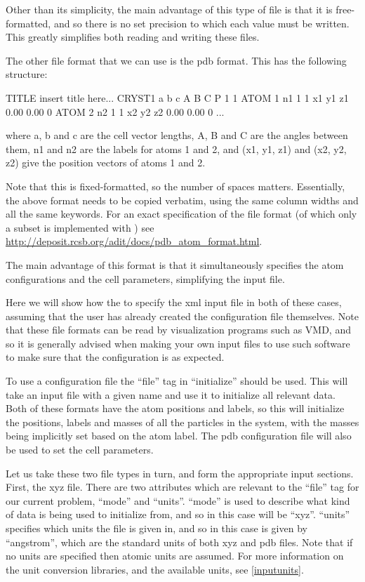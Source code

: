 \documentclass[11pt,english,fleqn]{report}
\newenvironment{code}{%
\footnotesize 
\verbatim
}{
\endverbatim
\normalsize
}
\begin{document}
Other than its simplicity, the main advantage of this type of file
is that it is free-formatted, and so there is no set precision
to which each value must be written. This greatly simplifies
both reading and writing these files.

The other file format that we can use is the pdb format. This
has the following structure:

\begin{code}
TITLE insert title here...
CRYST1        a        b        c      A      B      C P 1           1
ATOM      1   n1   1     1          x1      y1      z1  0.00  0.00             0
ATOM      2   n2   1     1          x2      y2      z2  0.00  0.00             0
...
\end{code}
where a, b and c are the cell vector lengths, A, B and C are the angles between
them, n1 and n2 are the labels for atoms 1 and 2, and (x1, y1, z1)
and (x2, y2, z2) give the position vectors of atoms 1 and 2. 

Note that this is
fixed-formatted, so the number of spaces matters. Essentially, the
above format needs to be copied verbatim, using the same column
widths and all the same keywords. For an exact specification
of the file format (of which only a subset is implemented 
with \ipi) see
\url{http://deposit.rcsb.org/adit/docs/pdb_atom_format.html}.

The main advantage of this format is that it simultaneously specifies
the atom configurations and the cell parameters, simplifying
the input file.

Here we will show how the to specify the xml input file
in both of these cases, assuming that the user has already
created the configuration file themselves.
Note that these file formats can be read by
visualization programs such as VMD, and so it is generally advised 
when making your own input files to
use such software to make sure that the configuration is as expected.

To use a configuration file the {}``file'' tag in {}``initialize'' should be used.
This will take an input file with a given name and use it to initialize
all relevant data. Both of these formats have the atom
positions and labels, so this will initialize the positions, labels
and masses of all the particles in the system, with the masses being
implicitly set based on the atom label. The pdb configuration file
will also be used to set the cell parameters.

Let us take these two file types in turn, and form the appropriate
input sections. First, the xyz file. 
There are two attributes which are relevant to the {}``file'' tag
for our current problem, {}``mode'' and {}``units''.
{}``mode'' is used to describe what kind of data is being used to
initialize from, and so in this case will be {}``xyz''.
{}``units'' specifies which units the file is given in, and
so in this case is given by {}``angstrom'', which are the
standard units of both xyz and pdb files. 
Note that if no units are specified then atomic units are assumed.
For more information on the \ipi unit conversion libraries, 
and the available units, see \ref{inputunits}.
\end{document}
